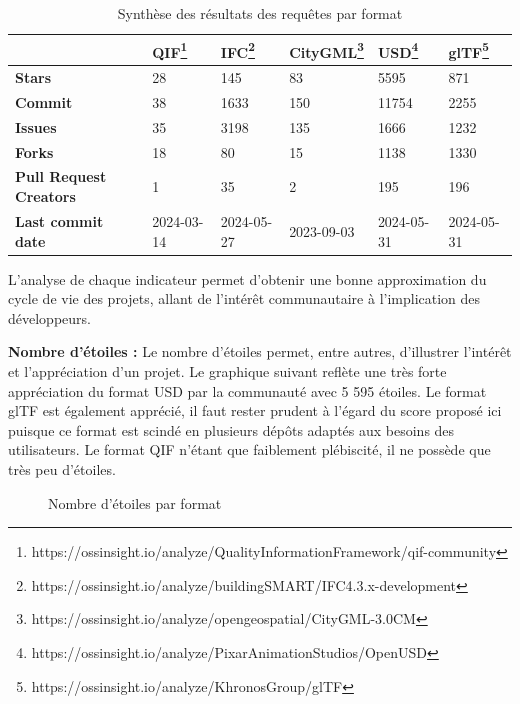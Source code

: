 \begin{table}[!h]
    \centering
    \caption{Synthèse des résultats des requêtes par format}
    \renewcommand{\arraystretch}{1.5} 
    \begin{tabularx}{\textwidth}{|l|X|X|X|X|X|} 
        \hline
        \rowcolor{white!75!black} \textbf{} & \textbf{QIF\footnote{https://ossinsight.io/analyze/QualityInformationFramework/qif-community}} & \textbf{IFC\footnote{https://ossinsight.io/analyze/buildingSMART/IFC4.3.x-development}} & \textbf{CityGML\footnote{https://ossinsight.io/analyze/opengeospatial/CityGML-3.0CM}} & \textbf{USD\footnote{https://ossinsight.io/analyze/PixarAnimationStudios/OpenUSD}} & \textbf{glTF\footnote{https://ossinsight.io/analyze/KhronosGroup/glTF}}\\
        \hline
        \textbf{Stars} & 28 & 145 & 83 & 5595 & 871 \\
        \hline
        \textbf{Commit} & 38 & 1633 & 150 & 11754 & 2255 \\
        \hline
        \textbf{Issues} & 35 & 3198 & 135 & 1666 & 1232 \\
        \hline
        \textbf{Forks} & 18 & 80 & 15 & 1138 & 1330 \\
        \hline
        \textbf{Pull Request Creators} & 1 & 35 & 2 & 195 & 196 \\
        \hline
        \textbf{Last commit date} & 2024-03-14 & 2024-05-27 & 2023-09-03 & 2024-05-31 & 2024-05-31 \\
        \hline
    \end{tabularx}
\end{table}

L'analyse de chaque indicateur permet d'obtenir une bonne approximation du cycle de vie des projets, allant de l'intérêt communautaire à l'implication des développeurs.

\newpage 

\textbf{Nombre d'étoiles :}
Le nombre d'étoiles permet, entre autres, d'illustrer l'intérêt et l'appréciation d'un projet.
Le graphique suivant reflète une très forte appréciation du format USD par la communauté avec 5 595 étoiles.
Le format glTF est également apprécié, il faut rester prudent à l'égard du score proposé ici puisque ce format est scindé en plusieurs dépôts adaptés aux besoins des utilisateurs.
Le format QIF n'étant que faiblement plébiscité, il ne possède que très peu d'étoiles.

\begin{figure}[!h]
    \centering
    \caption{Nombre d'étoiles par format}
    \label{fig:mon_graphique}
\end{figure}

